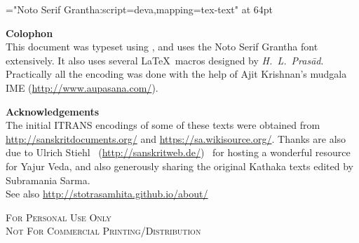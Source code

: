 \thispagestyle{empty}\clearpage
\begin{titlepage}
\vspace*{4.5cm}
\begin{center}
{\font\x="Noto Serif Grantha:script=deva,mapping=tex-text" at 64pt \x \titletext}
\end{center}
\end{titlepage}

\begin{center}
\small
\parbox{0.85\linewidth}{
{\Large \textbf{Colophon}}\\
\noindent This document was typeset using \XeLaTeX, and uses the Noto Serif Grantha font extensively. It also uses several \LaTeX\ macros designed by \textit{H.~L.~Prasād}. Practically all the encoding was done with the help of Ajit Krishnan's mudgala IME (\url{http://www.aupasana.com/}).
\vspace*{2cm}

{\large \textbf{Acknowledgements}}\\
The initial ITRANS encodings of some of these texts were obtained from \url{http://sanskritdocuments.org/} and \url{https://sa.wikisource.org/}. Thanks are also due to Ulrich Stiehl~ (\url{http://sanskritweb.de/}) ~for hosting a wonderful resource for Yajur Veda, and also generously sharing the original Kathaka texts edited by Subramania Sarma. \\
See also \url{http://stotrasamhita.github.io/about/}
\vspace*{1cm}
%
\begin{center}
{\scshape{For Personal Use Only\\
 Not For Commercial Printing/Distribution}}
\end{center}
}
\end{center}
\clearemptydoublepage %
\setcounter{page}{0} %
\renewcommand{\chaptermark}[1]{%
\markboth{#1}{}} %
\tableofcontents

\mbox{}
\clearpage
\thispagestyle{empty}
\clearemptydoublepage
